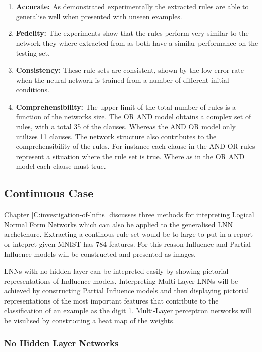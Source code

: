 \begin{enumerate}
	\item \textbf{Accurate:} As demonstrated experimentally the extracted rules are able to generalise well when presented with unseen examples.
	\item \textbf{Fedelity:} The experiments show that the rules perform very similar to the network they where extracted from as both have a similar performance on the testing set.
	\item \textbf{Consistency:} These rule sets are consistent, shown by the low error rate when the neural network is trained from a number of different initial conditions.
	\item \textbf{Comprehensibility:} The upper limit of the total number of rules is a function of the networks size. The OR AND model obtains a complex set of rules, with a total 35 of the clauses. Whereas the AND OR model only utilizes 11 clauses. The network structure also contributes to the comprehensibility of the rules. For instance each clause in the AND OR rules represent a situation where the rule set is true. Where as in the OR AND model each clause must true.
\end{enumerate}

\subsection{Continuous Case}
Chapter \ref{C:investigation-of-lnfns} discusses three methods for intepreting Logical Normal Form Networks which can also be applied to the generalised LNN archetchure. Extracting a continous rule set would be to large to put in a report or intepret given MNIST has 784 features. For this reason Influence and Partial Influence models will be constructed and presented as images.

LNNs with no hidden layer can be intepreted easily by showing pictorial representations of Indluence models. Interpreting Multi Layer LNNs will be achieved by constructing Partial Influence models and then displaying pictorial representations of the most important features that contribute to the classification of an example as the digit 1. Multi-Layer perceptron networks will be visulised by constructing a heat map of the weights.

\subsubsection{No Hidden Layer Networks}

